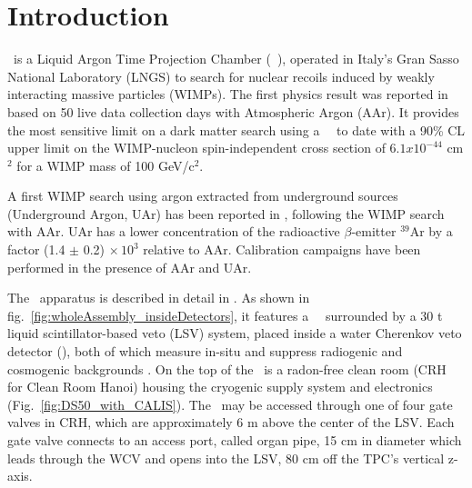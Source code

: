 \section{Introduction}\label{sec:intro}\label{sec:introduction}
\dsf\ is a Liquid Argon Time Projection Chamber (\lar\ \tpc), operated in Italy's Gran Sasso National Laboratory (LNGS) to search for nuclear recoils induced by weakly interacting massive particles (WIMPs). The first physics result was reported in \cite{Agnes:2015gu} based on 50 live data collection days with Atmospheric Argon (AAr). It provides the most sensitive limit on a dark matter search using a \lar\ \tpc\ to date with a 90\% CL upper limit on the WIMP-nucleon spin-independent cross section of $6.1 x 10^{-44}$ cm$^2$ for a WIMP mass of 100 GeV/c$^2$.  %

A first WIMP search using argon extracted from underground sources (Underground Argon, UAr) has been reported in \cite{Agnes:2015_uar}, following the WIMP search with AAr. UAr has a lower concentration of the radioactive $\beta$-emitter $^{39}$Ar by a factor (1.4 $\pm$ 0.2) $\times\, 10^3$ relative to AAr. Calibration campaigns have been performed in the presence of AAr and UAr.

The \dsf\ apparatus is described in detail in \cite{Agnes:2015gu}. As shown in fig.~\ref{fig:wholeAssembly_insideDetectors}, it features a \lar\ \tpc\ surrounded by a 30 t liquid scintillator-based veto (LSV) system, placed inside a water Cherenkov veto detector (\wcv), both of which measure in-situ and suppress radiogenic and cosmogenic backgrounds \cite{Agnes:2015qyz}. On the top of the \wcv\ is a radon-free clean room (CRH for Clean Room Hanoi) housing the cryogenic supply system and electronics (Fig.~\ref{fig:DS50_with_CALIS}). The \lsv\ may be accessed through one of four gate valves in CRH, which are approximately 6 m above the center of the LSV. Each gate valve connects to an access port, called organ pipe, 15 cm in diameter which leads through the WCV and opens into the LSV, 80 cm off the TPC's vertical z-axis.


